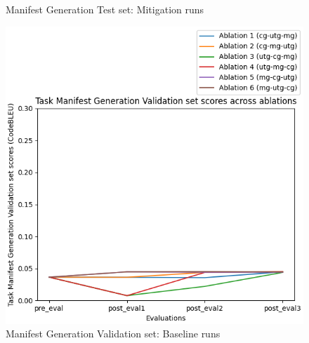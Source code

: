 \begin{figure}[H]
\begin{minipage}{0.45\textwidth}
        \captionsetup{width=1.1\textwidth}
        \caption{Manifest Generation Test set: Mitigation runs}
        \label{MGTestMitigation}
    \end{minipage}
\end{figure}

\begin{figure}[H]
    \centering
    \begin{minipage}{0.45\textwidth}
        \centering
        \includegraphics[width=1.1\textwidth]{Figures/results/code_baseline_graphs/task_eval/seed_averaged_task_mg_val_eval_baseline.png} %
        \captionsetup{width=1.1\textwidth}
        \caption{Manifest Generation Validation set: Baseline runs}
        \label{MGValBaseline}
    \end{minipage}\hfill
    \begin{minipage}{0.45\textwidth}
        \centering

\end{minipage}
\end{figure}
